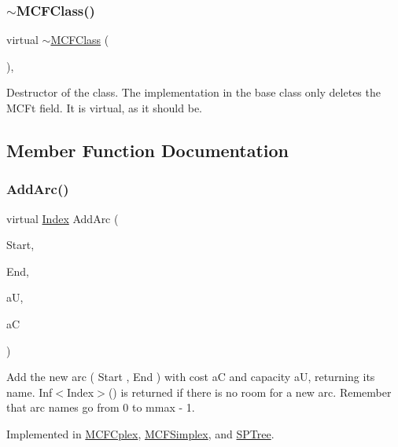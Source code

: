 \subsubsection{\texorpdfstring{$\sim$\+M\+C\+F\+Class()}{~MCFClass()}}
{\footnotesize\ttfamily virtual $\sim$\mbox{\hyperlink{class_m_c_f_class}{M\+C\+F\+Class}} (\begin{DoxyParamCaption}{ }\end{DoxyParamCaption})\hspace{0.3cm}{\ttfamily [inline]}, {\ttfamily [virtual]}}

Destructor of the class. The implementation in the base class only deletes the M\+C\+Ft field. It is virtual, as it should be. 

\subsection{Member Function Documentation}
\mbox{\label{class_m_c_f_class_a564d624f62ccc0c130d733cc5470cb6d}} 
\subsubsection{\texorpdfstring{Add\+Arc()}{AddArc()}}
{\footnotesize\ttfamily virtual \mbox{\hyperlink{class_m_c_f_class_ad53d6229d7ec28555a9c9c2fd9abf773}{Index}} Add\+Arc (\begin{DoxyParamCaption}\item[{\mbox{\hyperlink{class_m_c_f_class_a76aaabb20535c51a2752b93f6c38fe54}{c\+Index}}}]{Start,  }\item[{\mbox{\hyperlink{class_m_c_f_class_a76aaabb20535c51a2752b93f6c38fe54}{c\+Index}}}]{End,  }\item[{\mbox{\hyperlink{class_m_c_f_class_a11f747fbdff346237c8db4469d569994}{c\+F\+Number}}}]{aU,  }\item[{\mbox{\hyperlink{class_m_c_f_class_a07dbefeeb08c3f63073622411893eb76}{c\+C\+Number}}}]{aC }\end{DoxyParamCaption})\hspace{0.3cm}{\ttfamily [pure virtual]}}

Add the new arc ( Start , End ) with cost aC and capacity aU, returning its name. Inf$<$\+Index$>$() is returned if there is no room for a new arc. Remember that arc names go from 0 to mmax -\/ 1. 

Implemented in \mbox{\hyperlink{class_m_c_f_cplex_a57e7641179f820974444701d4f179fb6}{M\+C\+F\+Cplex}}, \mbox{\hyperlink{class_m_c_f_simplex_a57e7641179f820974444701d4f179fb6}{M\+C\+F\+Simplex}}, and \mbox{\hyperlink{class_s_p_tree_a57e7641179f820974444701d4f179fb6}{S\+P\+Tree}}.

